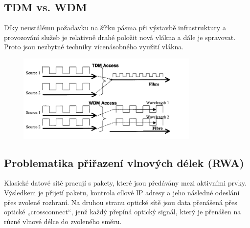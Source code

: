 \subsection{TDM vs. WDM}
Díky neustálému požadavku na šířku pásma při výstavbě infrastruktury a provozování služeb je relativně drahé položit nová vlákna a dále je
spravovat. Proto jsou nezbytné techniky vícenásobného využití vlákna.
\begin{figure} [h]
    \centering
    \includegraphics[width=0.8\textwidth]{snimky/TDMvsWDM.png}
    \label{fig:uml}
\end{figure}

\subsection{Problematika přiřazení vlnových délek (RWA)}
Klasické datové sítě pracují s pakety, které jsou předávány mezi aktivními prvky. Výsledkem je přijetí paketu, kontrola cílové IP adresy a jeho následné odeslání přes zvolené rozhraní. Na druhou stranu optické sítě jsou data přenášená přes optické „crossconnect“, jenž každý přepíná optický signál, který je přenášen na různé vlnové délce do zvoleného směru.
